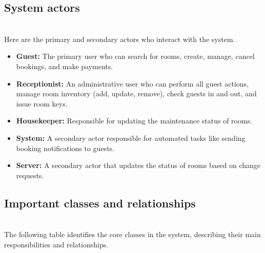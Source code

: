 \subsection{System actors}\label{f72mYXJGzG7illST3OGnH}
\\
Here are the primary and secondary actors who interact with the system.

\begin{itemize}
\item
\protect{}\label{7OcXw2A6bLQsM2QJZf_0q}
\textbf{Guest:} The primary user who can search for rooms, create, manage, cancel bookings, and make payments.
\item
\protect{}\label{0PLbRPhAryGOEH2ENsNAz}
\textbf{Receptionist:} An administrative user who can perform all guest actions, manage room inventory (add, update, remove), check guests in and out, and issue room keys.
\item
\protect{}\label{Yo4zs2rl9MQmtwwNqgAGR}
\textbf{Housekeeper:} Responsible for updating the maintenance status of rooms.
\item
\protect{}\label{ggEOdoLfZd0Co6GoEANVq}
\textbf{System:} A secondary actor responsible for automated tasks like sending booking notifications to guests.
\item
\protect{}\label{J-e_dRKW0TSg5qptWg_OS}
\textbf{Server:} A secondary actor that updates the status of rooms based on change requests.
\end{itemize}

\subsection{Important classes and relationships}\label{MrlLciD3b1fATGrbHXHpo}
\\
The following table identifies the core classes in the system, describing their main responsibilities and relationships.


